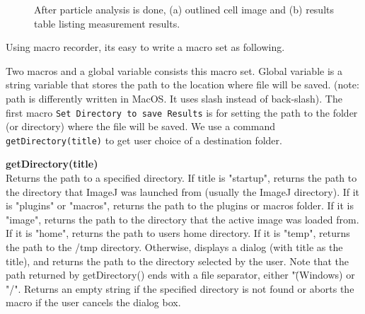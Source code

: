 \documentclass[11pt,a4paper,oneside]{report}
\newenvironment{indentCom}%
{\begin{list}{}%
         {\setlength{\leftmargin}{1em}}%
         \item[]%
}
{\end{list}}
\newcommand{\ilcom}[1]{\texttt{\small#1}}
\begin{document}
\begin{figure}[htbp]
 \centering
 \caption{ After particle analysis is done, (a) outlined cell image and (b) results table listing measurement results.}
 \label{fig:ParticleAnalysisResults}
\end{figure}

Using macro recorder, its easy to write a macro set as following. 



Two macros and a global variable consists this macro set. 
Global variable is a string variable that stores the path to the location where file will be saved. 
(note: path is differently written in MacOS. It uses slash instead of back-slash). 
The first macro \ilcom{Set Directory to save Results} is for setting the path to the folder 
(or directory) where the file will be saved. 
We use a command \ilcom{getDirectory(title)} to get user choice of a destination folder. 

\begin{indentCom}
\textbf{getDirectory(title)}\\
Returns the path to a specified directory. If title is "startup", returns the path to the directory 
that ImageJ was launched from (usually the ImageJ directory). If it is "plugins" or 
"macros", returns the path to the plugins or macros folder. If it is "image", 
returns the path to the directory that the active image was loaded from. 
If it is "home", returns the path to users home directory. 
If it is "temp", returns the path to the /tmp directory. 
Otherwise, displays a dialog (with title as the title), 
and returns the path to the directory selected by the user. 
Note that the path returned by getDirectory() ends with a file separator, 
either "\" (Windows) or "/". Returns an empty string if the specified directory is not found or 
aborts the macro if the user cancels the dialog box.
\end{indentCom}
\end{document}
